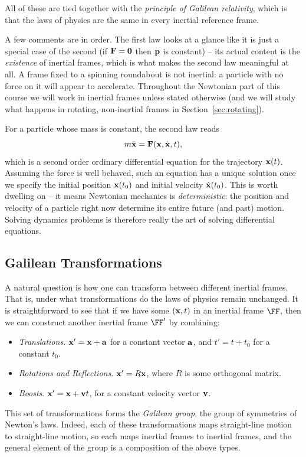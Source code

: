 \documentclass[a4paper]{scrartcl}
\begin{document}
All of these are tied together with the \emph{principle of Galilean relativity}, which is that the laws of physics are the same in every inertial reference frame.

A few comments are in order. The first law looks at a glance like it is just a special case of the second (if $\mathbf{F} = \mathbf{0}$ then $\mathbf{p}$ is constant) -- its actual content is the \emph{existence} of inertial frames, which is what makes the second law meaningful at all. A frame fixed to a spinning roundabout is not inertial: a particle with no force on it will appear to accelerate. Throughout the Newtonian part of this course we will work in inertial frames unless stated otherwise (and we will study what happens in rotating, non-inertial frames in Section~\ref{sec:rotating}).

For a particle whose mass is constant, the second law reads
$$
m \ddot{\mathbf{x}} = \mathbf{F}(\mathbf{x}, \dot{\mathbf{x}}, t),
$$
which is a second order ordinary differential equation for the trajectory $\mathbf{x}(t)$. Assuming the force is well behaved, such an equation has a unique solution once we specify the initial position $\mathbf{x}(t_0)$ and initial velocity $\dot{\mathbf{x}}(t_0)$. This is worth dwelling on -- it means Newtonian mechanics is \emph{deterministic}: the position and velocity of a particle right now determine its entire future (and past) motion. Solving dynamics problems is therefore really the art of solving differential equations.

\subsection{Galilean Transformations}

A natural question is how one can transform between different inertial frames. That is, under what transformations do the laws of physics remain unchanged. It is straightforward to see that if we have some $(\mathbf{x}, t)$ in an inertial frame $\FF$, then we can construct another inertial frame $\FF'$ by combining:
\begin{itemize}
	\item \emph{Translations}. $\mathbf{x}' = \mathbf{x} + \mathbf{a}$ for a constant vector $\mathbf{a}$, and $t' = t + t_0$ for a constant $t_0$.
	\item \emph{Rotations and Reflections}. $\mathbf{x}' = R \mathbf{x}$, where $R$ is some orthogonal matrix.
	\item \emph{Boosts}. $\mathbf{x}' = \mathbf{x} + \mathbf{v} t$, for a constant velocity vector $\mathbf{v}$.
\end{itemize}
This set of transformations forms the \emph{Galilean group}, the group of symmetries of Newton's laws. Indeed, each of these transformations maps straight-line motion to straight-line motion, so each maps inertial frames to inertial frames, and the general element of the group is a composition of the above types.
\end{document}
